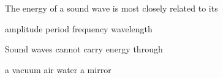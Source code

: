 \documentclass[answers]{exam}
\begin{document}
\begin{questions}
\question
The energy of a sound wave is most closely related to its

\begin{randomizechoices}
    \correctchoice amplitude
    \choice period
    \choice frequency
    \choice wavelength
\end{randomizechoices}





\question 
Sound waves cannot carry energy through

\begin{randomizechoices}
    \correctchoice a vacuum
    \choice air
    \choice water
    \choice a mirror
\end{randomizechoices}


\end{questions}
\end{document}
